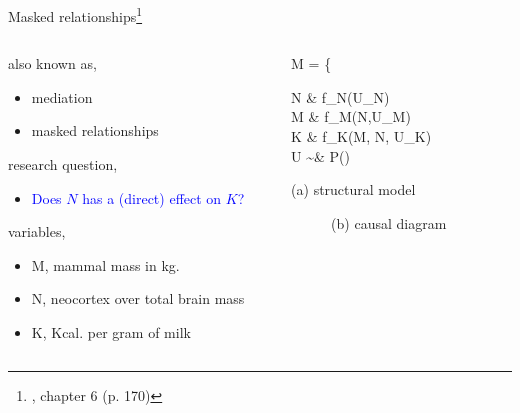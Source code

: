 \begin{frame}
	{Masked relationships\footnote{\citet{McElreath_2020}, chapter 6 (p. 170)}}
	\begin{columns}
		\begin{column}{0.5\textwidth}
			also known as,
			\begin{itemize}
				\item mediation
				\item masked relationships
			\end{itemize}
			
			research question, 
			\begin{itemize}
				\item \textcolor{blue}{Does $N$ has a (direct) effect on $K$?}
			\end{itemize}
			
			variables,
			\begin{itemize}
				\item M, mammal mass in kg.
				\item N, neocortex over total brain mass
				\item K, Kcal. per gram of milk
			\end{itemize}
		\end{column}
		\begin{column}{0.5\textwidth}  
			\begin{equ}
				M = \left\{ \begin{aligned} 
					N \leftarrow & \; f_{N}(U_{N}) \\
					M \leftarrow & \; f_{M}(N,U_{M}) \\
					K \leftarrow & \; f_{K}(M, N, U_{K}) \\
					U \sim & \; P()
				\end{aligned} \right
				\caption*{(a) structural model}
			\end{equ}
			\begin{figure}
				\caption*{(b) causal diagram}
			\end{figure}
		\end{column}
	\end{columns}
\end{frame}
